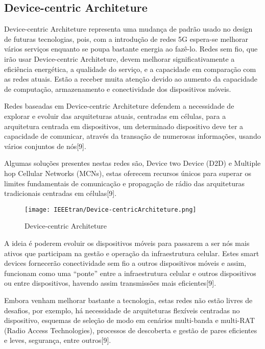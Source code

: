 \documentclass[conference]{IEEEtran}
\begin{document}
\subsection{Device-centric Architeture}
Device-centric Architeture representa uma mudança de padrão usado no design de futuras tecnologias, pois, com a introdução de redes 5G espera-se melhorar vários serviços enquanto se poupa bastante energia ao fazê-lo. Redes sem fio, que irão usar Device-centric Architeture, devem melhorar significativamente a eficiência energética, a qualidade do serviço, e a capacidade em comparação com as redes atuais. Estão a receber muita atenção devido ao aumento da capacidade de computação, armazenamento e conectividade dos dispositivos móveis. \par
Redes baseadas em Device-centric Architeture defendem a necessidade de explorar e evoluir das arquiteturas atuais, centradas em células, para a arquitetura centrada em dispositivos, um determinado dispositivo deve ter a capacidade de comunicar, através da transação de numerosas informações, usando vários conjuntos de nós[9].\par
Algumas soluções presentes nestas redes são, Device two Device (D2D) e Multiple hop Cellular Networks (MCNs), estas oferecem recursos únicos para superar os limites fundamentais de comunicação e propagação de rádio das arquiteturas tradicionais centradas em células[9].
\begin{figure}[ht]
    \centering
    \texttt{[image: IEEEtran/Device-centricArchiteture.png]}
    \caption{Device-centric Architeture}
\end{figure}
A ideia é poderem evoluir os dispositivos móveis para passarem a ser nós mais ativos que participam na gestão e operação da infraestrutura celular. Estes smart devices fornecerão conectividade sem fio a outros dispositivos móveis e assim, funcionam como uma “ponte” entre a infraestrutura celular e outros dispositivos ou entre dispositivos, havendo assim transmissões mais eficientes[9].\par
Embora venham melhorar bastante a tecnologia, estas redes não estão livres de desafios, por exemplo, há necessidade de arquiteturas flexíveis centradas no dispositivo, esquemas de seleção de modo em cenários multi-banda e multi-RAT (Radio Access Technologies), processos de descoberta e gestão de pares eficientes e leves, segurança, entre outros[9].
\end{document}
